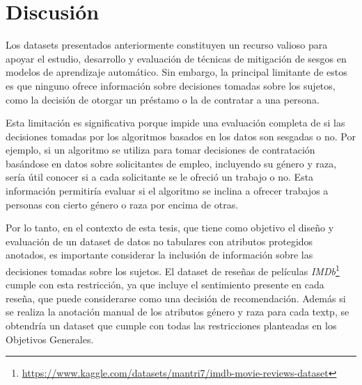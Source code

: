 \section{Discusi\'on}

Los datasets presentados anteriormente constituyen un recurso valioso para apoyar el estudio, desarrollo y evaluaci\'on de t\'ecnicas de 
mitigaci\'on de sesgos en modelos de aprendizaje autom\'atico. Sin embargo, la principal limitante de estos es que ninguno ofrece 
informaci\'on sobre decisiones tomadas sobre los sujetos, como la decisi\'on de otorgar un pr\'estamo o la de contratar a una persona.

Esta limitaci\'on es significativa porque impide una evaluaci\'on completa de si las decisiones tomadas por los algoritmos basados 
en los datos son sesgadas o no. Por ejemplo, si un algoritmo se utiliza para tomar decisiones de contrataci\'on bas\'andose en datos
sobre solicitantes de empleo, incluyendo su g\'enero y raza, ser\'ia \'util conocer si a cada solicitante se le ofreci\'o 
un trabajo o no. Esta informaci\'on permitir\'ia evaluar si el algoritmo se inclina a ofrecer trabajos a personas con cierto g\'enero o raza
por encima de otras.

Por lo tanto, en el contexto de esta tesis, que tiene como objetivo el dise\~no y evaluaci\'on de un dataset de datos no tabulares
con atributos protegidos anotados, es importante considerar la inclusi\'on de informaci\'on sobre las decisiones tomadas sobre los sujetos.
El dataset de rese\~nas de pel\'iculas \emph{IMDb}\footnote{\url{https://www.kaggle.com/datasets/mantri7/imdb-movie-reviews-dataset}}
cumple con esta restricci\'on, ya que incluye el sentimiento presente en cada rese\~na, que puede considerarse como una decisi\'on de 
recomendaci\'on. Adem\'as si se realiza la anotaci\'on manual de los atributos g\'enero y raza para cada textp, se obtendr\'ia un dataset
que cumple con todas las restricciones planteadas en los Objetivos Generales.